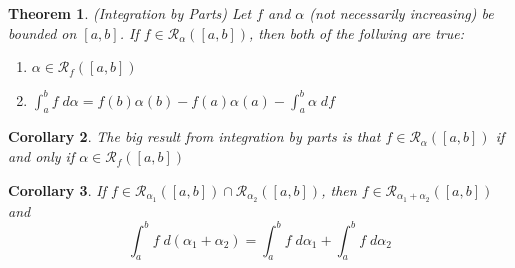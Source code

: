 \documentclass[12pt]{book}
\numberwithin{equation}{section} %
\theoremstyle{plain}
\newtheorem{thm}{Theorem}[section]
\newtheorem{cor}[thm]{Corollary}
\theoremstyle{definition}
\theoremstyle{remark}
\begin{document}
\begin{thm}
\label{thm.intbyparts}
\emph{(Integration by Parts)}
Let $f$ and $\alpha$ (not necessarily increasing) be bounded on $[a,b]$.
If $f\in\mathscr{R}_\alpha([a,b])$, then both of the follwing are true:
\begin{enumerate}[label=\emph{(\roman*)}]
  \item $\alpha\in\mathscr{R}_f([a,b])$
  \item
    $\int^b_a f\;d\alpha = f(b) \alpha(b) - f(a)\alpha(a) - \int^b_a
    \alpha \; df$
\end{enumerate}
\end{thm}
\begin{cor}
The big result from integration by parts is that
$f\in\mathscr{R}_\alpha([a,b])$ if and only if $\alpha\in\mathscr{R}_f([a,b])$
\end{cor}

\begin{cor}
If $f\in\mathscr{R}_{\alpha_1}([a,b]) \cap \mathscr{R}_{\alpha_2}([a,b])$, then $f\in\mathscr{R}_{\alpha_1 + \alpha_2}([a,b])$ and
    \[ \int^b_a f\;d(\alpha_1 + \alpha_2) =
    \int^b_a f\;d\alpha_1 + \int^b_a f\;d\alpha_2 \]
\end{cor}
\end{document}
